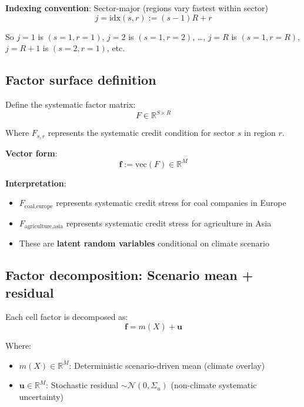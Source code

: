 \documentclass[11pt,a4paper]{article}
\begin{document}
\textbf{Indexing convention}: Sector-major (regions vary fastest within sector)
\begin{equation}
j = \text{idx}(s,r) := (s-1)R + r
\end{equation}

So $j=1$ is $(s=1, r=1)$, $j=2$ is $(s=1, r=2)$, \ldots, $j=R$ is $(s=1, r=R)$, $j=R+1$ is $(s=2, r=1)$, etc.

\subsection{Factor surface definition}

Define the systematic factor matrix:
\begin{equation}
F \in \mathbb{R}^{S \times R}
\end{equation}

Where $F_{s,r}$ represents the systematic credit condition for sector $s$ in region $r$.

\textbf{Vector form}:
\begin{equation}
\mathbf{f} := \text{vec}(F) \in \mathbb{R}^M
\end{equation}

\textbf{Interpretation}:
\begin{itemize}
    \item $F_{\text{coal,europe}}$ represents systematic credit stress for coal companies in Europe
    \item $F_{\text{agriculture,asia}}$ represents systematic credit stress for agriculture in Asia
    \item These are \textbf{latent random variables} conditional on climate scenario
\end{itemize}

\subsection{Factor decomposition: Scenario mean + residual}

Each cell factor is decomposed as:
\begin{equation}
\mathbf{f} = m(X) + \mathbf{u}
\end{equation}

Where:
\begin{itemize}
    \item $m(X) \in \mathbb{R}^M$: Deterministic scenario-driven mean (climate overlay)
    \item $\mathbf{u} \in \mathbb{R}^M$: Stochastic residual $\sim \mathcal{N}(0, \Sigma_u)$ (non-climate systematic uncertainty)
\end{itemize}
\end{document}
